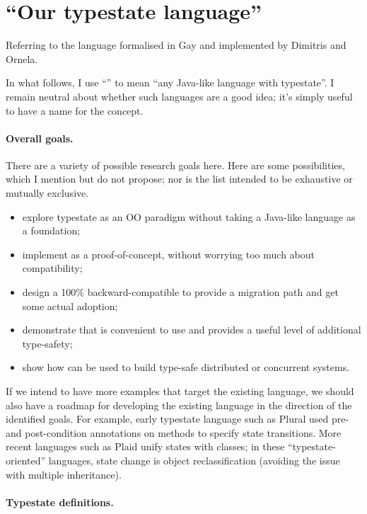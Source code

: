 \section{``Our typestate language''}

Referring to the language formalised in Gay \etal \cite{gay10} and
implemented by Dimitris and Ornela.

In what follows, I use ``\TypestateJava'' to mean ``any Java-like
language with typestate''. I remain neutral about whether such
languages are a good idea; it's simply useful to have a name for the
concept.

\paragraph{Overall goals.}

There are a variety of possible research goals here. Here are some
possibilities, which I mention but do not propose; nor is the list
intended to be exhaustive or mutually exclusive.

\begin{itemize}
\item explore typestate as an OO paradigm without taking a Java-like
  language as a foundation;
\item implement \TypestateJava as a proof-of-concept, without worrying
  too much about compatibility;
\item design a 100\% backward-compatible \TypestateJava to provide a
  migration path and get some actual adoption;
\item demonstrate that \TypestateJava is convenient to use and
  provides a useful level of additional type-safety;
\item show how \TypestateJava can be used to build type-safe
  distributed or concurrent systems.
\end{itemize}

\noindent If we intend to have more examples that target the existing
language, we should also have a roadmap for developing the existing
language in the direction of the identified goals. For example, early
typestate language such as Plural \cite{bierhoff11} used pre- and
post-condition annotations on methods to specify state transitions.
More recent languages such as Plaid \cite{garcia14} unify states with
classes; in these ``typestate-oriented'' languages, state change is
object reclassification (avoiding the issue with multiple
inheritance).

\paragraph{Typestate definitions.}

